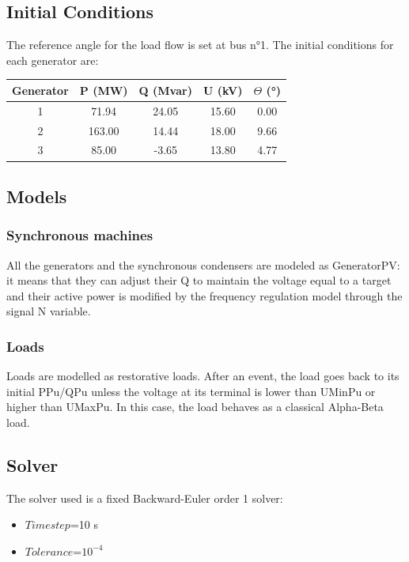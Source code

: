 \documentclass[a4paper, 12pt]{report}
\begin{document}
\subsection{Initial Conditions}

The reference angle for the load flow is set at bus n°1. The initial conditions for each generator
are:
\begin{center}
\begin{tabular}{|c|c|c|c|c|}
  \hline
  Generator & P (MW) & Q (Mvar) & U (kV) & $\Theta$ (°) \\
  \hline
  1 & 71.94 & 24.05 & 15.60 & 0.00\\
  2 & 163.00 & 14.44 & 18.00 & 9.66\\
  3 & 85.00 & -3.65 & 13.80 & 4.77\\
  \hline
\end{tabular}
\end{center}

\subsection{Models}

\subsubsection{Synchronous machines}

All the generators and the synchronous condensers are modeled as GeneratorPV: it means that they can adjust their Q to maintain the voltage equal to a target and their active power is modified by the frequency regulation model through the signal N variable.

\subsubsection{Loads}

Loads are modelled as restorative loads. After an event, the load goes back to its initial PPu/QPu unless the voltage at its terminal is lower than UMinPu or higher than UMaxPu. In this case, the load behaves as a classical Alpha-Beta load.

\subsection{Solver}
The solver used is a fixed Backward-Euler order 1 solver:
\begin{itemize}
\item $Time step$=10 s
\item $Tolerance$=$10^{-4}$
\end{itemize}
\end{document}
